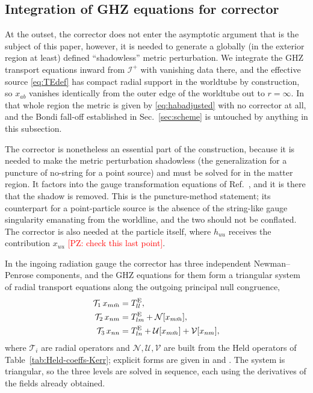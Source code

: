 \documentclass[%
reprint,
 prd,
superscriptaddress,
nofootinbib,
aps,
dvipsnames
]{revtex4-2}
\newcommand{\PZ}[1]{\textcolor{red}{\textsf{[PZ: #1]}}}
\begin{document}
\subsection{Integration of GHZ equations for corrector}
\label{sec:corrector}

At the outset, the corrector does not enter the
asymptotic argument that is the subject of this paper, however, it is needed 
to generate a globally (in the exterior region at least) defined
``shadowless'' metric perturbation.  We integrate the GHZ
transport equations inward from ${\mathscr I}^{+}$ with vanishing data there,
and the effective source \eqref{eq:TEdef} has compact radial support in the
worldtube by construction, so $x_{ab}$ vanishes identically from the outer
edge of the worldtube out to $r=\infty$. In that whole region the metric is
given by \eqref{eq:habadjusted} with no corrector at all, and the Bondi
fall-off established in Sec.~\ref{sec:scheme} is untouched by anything in
this subsection.

The corrector is nonetheless an essential part of the construction, because
it is needed to make the metric perturbation shadowless 
(the generalization for a puncture of no-string for a point source) and must be solved for in the matter region. It factors into the gauge transformation equations of
Ref.~\cite{Toomani:2021jlo}, and it is there that the shadow is removed.
This is the puncture-method statement; its counterpart for a point-particle
source is the absence of the string-like gauge singularity emanating from the
worldline, and the two should not be conflated. The corrector is also needed
at the particle itself, where $h_{uu}$ receives the contribution $x_{uu}$ \PZ{check this last point}.

In the ingoing radiation gauge the corrector has three independent
Newman--Penrose components, and the GHZ equations for them form a triangular
system of radial transport equations along the outgoing principal null
congruence,
\begin{subequations}\label{eq:corrector hierarchy}
\begin{align}
  \mathcal{T}_{1}\,x_{m\bar m} &= T^{\rm E}_{ll},
  \label{eq:corrector mmbar}\\
  \mathcal{T}_{2}\,x_{nm} &= T^{\rm E}_{lm} + \mathcal{N}[x_{m\bar m}],
  \label{eq:corrector nm}\\
  \mathcal{T}_{3}\,x_{nn} &= T^{\rm E}_{ln}
    + \mathcal{U}[x_{m\bar m}] + \mathcal{V}[x_{nm}],
  \label{eq:corrector nn}
\end{align}
\end{subequations}
where $\mathcal{T}_{i}$ are radial operators and
$\mathcal{N},\mathcal{U},\mathcal{V}$ are built from the Held operators of
Table~\ref{tab:Held-coeffs-Kerr}; explicit forms are given in
\cite{Green:2019nam} and \cite[Sec.~3.1.3]{Hollands:2024iqp}. The system is
triangular, so the three levels are solved in sequence, each using the
derivatives of the fields already obtained.
\end{document}
